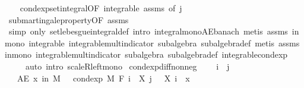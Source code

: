 \begin{isabellebody}
%
\isadelimproof
\ \ %
\endisadelimproof
%
\isatagproof
{}\isamarkupfalse%
\ cond{\isacharunderscore}{\kern0pt}exp{\isacharunderscore}{\kern0pt}set{\isacharunderscore}{\kern0pt}integral{\isacharbrackleft}{\kern0pt}OF\ integrable\ assms{\isacharparenleft}{\kern0pt}{}{\isacharparenright}{\kern0pt}{\isacharcomma}{\kern0pt}\ of\ j{\isacharbrackright}{\kern0pt}\ \ \isanewline
\ \ \isamarkupfalse%
\ submartingale{\isacharunderscore}{\kern0pt}property{\isacharbrackleft}{\kern0pt}OF\ assms{\isacharparenleft}{\kern0pt}{}{\isacharparenright}{\kern0pt}{\isacharbrackright}{\kern0pt}\isanewline
\ \ \isamarkupfalse%
\ {\isacharparenleft}{\kern0pt}simp\ only{\isacharcolon}{\kern0pt}\ set{\isacharunderscore}{\kern0pt}lebesgue{\isacharunderscore}{\kern0pt}integral{\isacharunderscore}{\kern0pt}def{\isacharcomma}{\kern0pt}\ intro\ integral{\isacharunderscore}{\kern0pt}mono{\isacharunderscore}{\kern0pt}AE{\isacharunderscore}{\kern0pt}banach{\isacharcomma}{\kern0pt}\ metis\ assms{\isacharparenleft}{\kern0pt}{}{\isacharparenright}{\kern0pt}\ in{\isacharunderscore}{\kern0pt}mono\ integrable\ integrable{\isacharunderscore}{\kern0pt}mult{\isacharunderscore}{\kern0pt}indicator\ subalgebra\ subalgebra{\isacharunderscore}{\kern0pt}def{\isacharcomma}{\kern0pt}\ metis\ assms{\isacharparenleft}{\kern0pt}{}{\isacharparenright}{\kern0pt}\ in{\isacharunderscore}{\kern0pt}mono\ integrable{\isacharunderscore}{\kern0pt}mult{\isacharunderscore}{\kern0pt}indicator\ subalgebra\ subalgebra{\isacharunderscore}{\kern0pt}def\ integrable{\isacharunderscore}{\kern0pt}cond{\isacharunderscore}{\kern0pt}exp{\isacharparenright}{\kern0pt}\ \isanewline
\ \ \ \ \ {\isacharparenleft}{\kern0pt}auto\ intro{\isacharcolon}{\kern0pt}\ scaleR{\isacharunderscore}{\kern0pt}left{\isacharunderscore}{\kern0pt}mono{\isacharparenright}{\kern0pt}%
\endisatagproof
{\isafoldproof}%
%
\isadelimproof
\isanewline
%
\endisadelimproof
\isanewline
{}\isamarkupfalse%
\ cond{\isacharunderscore}{\kern0pt}exp{\isacharunderscore}{\kern0pt}diff{\isacharunderscore}{\kern0pt}nonneg{\isacharcolon}{\kern0pt}\ \isanewline
\ \ \ {\isachardoublequoteopen}i\ {\isasymle}\ j{\isachardoublequoteclose}\isanewline
\ \ \ {\isachardoublequoteopen}AE\ x\ in\ M{\isachardot}{\kern0pt}\ {}\ {\isasymle}\ cond{\isacharunderscore}{\kern0pt}exp\ M\ {\isacharparenleft}{\kern0pt}F\ i{\isacharparenright}{\kern0pt}\ {\isacharparenleft}{\kern0pt}{\isasymlambda}{\isasymxi}{\isachardot}{\kern0pt}\ X\ j\ {\isasymxi}\ {\isacharminus}{\kern0pt}\ X\ i\ {\isasymxi}{\isacharparenright}{\kern0pt}\ x{\isachardoublequoteclose}\isanewline

\end{isabellebody}
